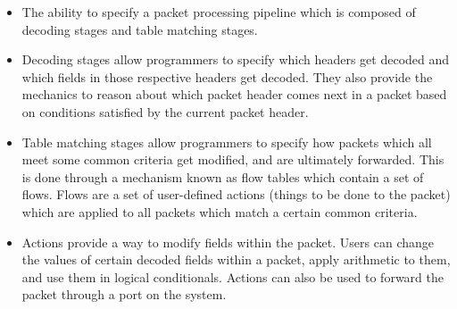 \begin{itemize}
\item The ability to specify a packet processing pipeline which is composed of decoding stages and table matching stages.

\item Decoding stages allow programmers to specify which headers get decoded and which fields in those respective headers get decoded. They also provide the mechanics to reason about which packet header comes next in a packet based on conditions satisfied by the current packet header.

\item 
Table matching stages allow programmers to specify how packets which all meet some common criteria get modified, and are ultimately forwarded. This is done through a mechanism known as flow tables which contain a set of flows. Flows are a set of user-defined actions (things to be done to the packet) which are applied to all packets which match a certain common criteria.

\item
Actions provide a way to modify fields within the packet. Users can change the values of certain decoded fields within a packet, apply arithmetic to them, and use them in logical conditionals. Actions can also be used to forward the packet through a port on the system.

\end{itemize}
